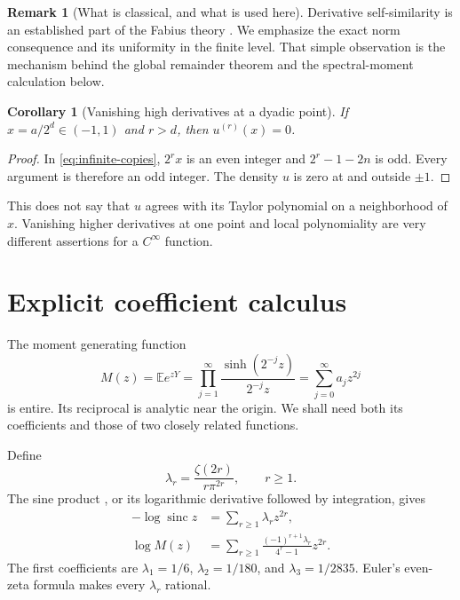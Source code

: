 \documentclass[11pt,a4paper]{article}
\numberwithin{equation}{section}
\newtheorem{corollary}[corollary]{Corollary}
\theoremstyle{definition}
\newtheorem{remark}[remark]{Remark}
\newcommand{\E}{\mathbb E}
\newcommand{\sinc}{\operatorname{sinc}}
\begin{document}
\begin{remark}[What is classical, and what is used here]
Derivative self-similarity is an established part of the Fabius theory
\cite{arias1982,arias2018}. We emphasize the exact norm consequence and
its uniformity in the finite level. That simple observation is the
mechanism behind the global remainder theorem and the spectral-moment
calculation below.
\end{remark}

\begin{corollary}[Vanishing high derivatives at a dyadic point]\label{cor:dyadic-jet}
If $x=a/2^d\in(-1,1)$ and $r>d$, then $u^{(r)}(x)=0$.
\end{corollary}
\begin{proof}
In \eqref{eq:infinite-copies}, $2^rx$ is an even integer and
$2^r-1-2n$ is odd. Every argument is therefore an odd integer.
The density $u$ is zero at and outside $\pm1$.
\end{proof}

This does not say that $u$ agrees with its Taylor polynomial on a
neighborhood of $x$. Vanishing higher derivatives at one point and
local polynomiality are very different assertions for a $C^\infty$
function.

\section{Explicit coefficient calculus}\label{sec:coefficients}

The moment generating function
\begin{equation}
 M(z)=\E e^{zY}=\prod_{j=1}^{\infty}
          \frac{\sinh(2^{-j}z)}{2^{-j}z}
      =\sum_{j=0}^{\infty}a_jz^{2j}
 \label{eq:MGF}
\end{equation}
is entire. Its reciprocal is analytic near the origin. We shall need
both its coefficients and those of two closely related functions.

Define
\begin{equation}
 \lambda_r=\frac{\zeta(2r)}{r\pi^{2r}},\qquad r\geq1.
 \label{eq:lambda}
\end{equation}
The sine product \cite[Sec.~4.22]{dlmf}, or its logarithmic derivative
followed by integration, gives
\begin{align}
 -\log\sinc z&=\sum_{r\geq1}\lambda_rz^{2r},\label{eq:log-sinc}\\
 \log M(z)&=\sum_{r\geq1}
     \frac{(-1)^{r+1}\lambda_r}{4^r-1}z^{2r}.
 \label{eq:logM}
\end{align}
The first coefficients are
$\lambda_1=1/6$, $\lambda_2=1/180$, and $\lambda_3=1/2835$.
Euler's even-zeta formula makes every $\lambda_r$ rational.
\end{document}
